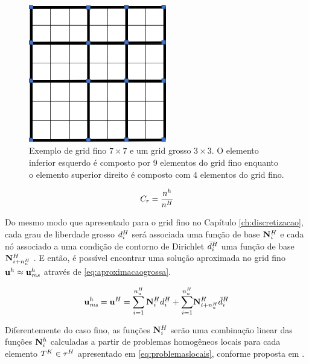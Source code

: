 \begin{figure}[!htbp]
\centering
\includegraphics[width=6cm]{chap06/figs/grosso.png}
\caption{Exemplo de grid fino $7\times 7$ e um grid grosso $3\times 3$. O elemento inferior esquerdo é composto por 9 elementos do grid fino enquanto o elemento superior direito é composto com 4 elementos do grid fino.}
\label{fig:gridgrosso}
\end{figure}


\begin{equation} \label{eq:fatordeengrossamento}
    C_r = \frac{n^h}{n^H}
\end{equation}




Do mesmo modo que apresentado para o grid fino no Capítulo \ref{ch:discretizacao}, cada grau de liberdade grosso $d^H_{i}$  será associada uma função de base $\mathbf{N}_{i}^H$ e cada nó associado a uma condição de contorno de Dirichlet $\bar{d}^H_{i}$ uma função de base ${\mathbf{N}_{i+n_u^H}^H}$ . E então, é possível encontrar uma solução aproximada no grid fino $\mathbf{u}^h \approx \mathbf{u}^h_{\textit{ms}}$ através de \eqref{eq:aproximacaogrossa}.

\begin{equation} \label{eq:aproximacaogrossa}
    \mathbf{u}^h_{\textit{ms}} = \mathbf{u}^H = \sum_{i=1}^{n_u^H} \mathbf{N}_{i}^H d^H_{i} + {\sum_{i=1}^ {n_u^H}}  {\mathbf{N}_{i+n_u^H}^H} \bar{d}^H_{i}
\end{equation}


Diferentemente do caso fino, as funções $\mathbf{N}_{i}^H$ serão uma combinação linear das funções ${\mathbf{N}_{i}^h}$ calculadas a partir de problemas homogêneos locais  para cada elemento $T^K \in \tau^H$  apresentado em \eqref{eq:problemaslocais}, conforme proposta em \cite{casteletto}.


